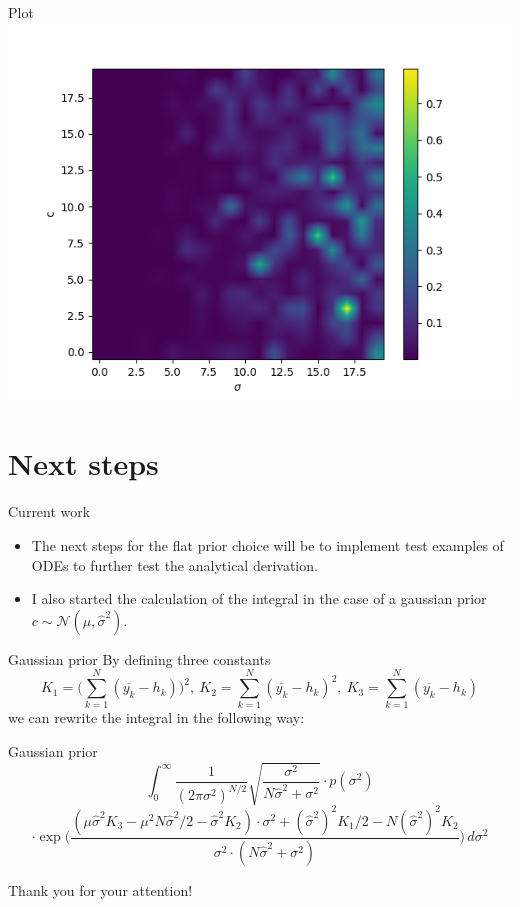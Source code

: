 \documentclass{beamer}
\newcommand{\s}{\sigma^2}
\newcommand{\sh}{\hat{\sigma}^2}
\begin{document}
	\begin{frame}{Plot}
		\includegraphics[scale=0.8]{heatmap.png}
	\end{frame}

\section{Next steps}

	\begin{frame}{Current work}
		\begin{itemize}
			\item The next steps for the flat prior choice will be to implement 
			test examples of ODEs to further test the analytical derivation.
			\item I also started the calculation of the integral in the case of a 
			gaussian prior $c  \sim \mathcal{N}(\mu, \hat{\sigma}^2)$.
		\end{itemize}
	\end{frame}

	\begin{frame}{Gaussian prior}
		By defining three constants
		\[
			K_1 = \biggl(\sum_{k = 1}^N (\overline{y_k} - h_k) \biggr)^2, \ K_2 
			= \sum_{k = 1}^N (\overline{y_k} - h_k)^2, \ K_3 = 
			\sum_{k = 1}^N (\overline{y_k} - h_k)
		\]
		we can rewrite the integral in the following way:
	\end{frame}

	\begin{frame}{Gaussian prior}
		\[
    		\int_0^{\infty} \frac{1}{(2\pi\s)^{N/2}} \sqrt{\frac{\s}{N\sh + \s}}
    		\cdot p(\s)
		\]
		\[
   			\cdot \exp \biggl(\frac{(\mu \sh K_3 - \mu^2 N \sh /2 - \sh K_2) \cdot 
   			\s + (\sh)^2 K_1 /2 - N (\sh)^2 K_2}{\s \cdot (N\sh + \s)} \biggr)
   		 	\, d\s
		\]
	\end{frame}
	
	\begin{frame}
		Thank you for your attention!
	\end{frame}
\end{document}

